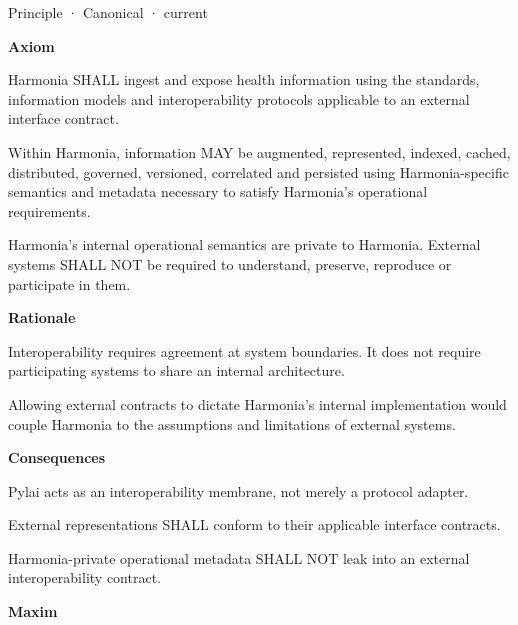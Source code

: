 \label{element:eee8c3783d964d18a7f9dcea85fcd4cf}
{\small Principle · Canonical · current}\par

\par\medskip\textbf{Axiom}\par


Harmonia SHALL ingest and expose health information using the standards,
information models and interoperability protocols applicable to an
external interface contract.



Within Harmonia, information MAY be augmented, represented, indexed,
cached, distributed, governed, versioned, correlated and persisted using
Harmonia-specific semantics and metadata necessary to satisfy Harmonia's
operational requirements.



Harmonia's internal operational semantics are private to Harmonia.
External systems SHALL NOT be required to understand, preserve,
reproduce or participate in them.



\par\medskip\textbf{Rationale}\par


Interoperability requires agreement at system boundaries. It does not
require participating systems to share an internal architecture.



Allowing external contracts to dictate Harmonia's internal
implementation would couple Harmonia to the assumptions and limitations
of external systems.



\par\medskip\textbf{Consequences}\par


Pylai acts as an interoperability membrane, not merely a protocol
adapter.



External representations SHALL conform to their applicable interface
contracts.



Harmonia-private operational metadata SHALL NOT leak into an external
interoperability contract.



\par\medskip\textbf{Maxim}\par


